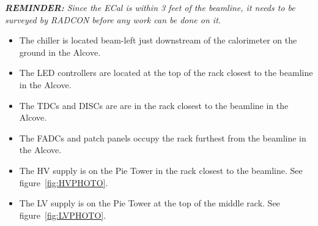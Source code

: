 \documentclass[12pt]{article}
\begin{document}
   {\em{\bf REMINDER:} Since the ECal is within 3 feet of the beamline, it needs to be surveyed by RADCON before any work can be done on it.}
   {\footnotesize
\begin{itemize}
\item
The chiller is located beam-left just downstream of the calorimeter on the ground in the Alcove.
\item
The LED controllers are located at the top of the rack closest to the beamline in the Alcove.
\item
The TDCs and DISCs are are in the rack closest to the beamline in the Alcove.
\item
The FADCs and patch panels occupy the rack furthest from the beamline in the Alcove.
\item
    The HV supply is on the Pie Tower in the rack closest to the beamline.  See figure~\ref{fig:HVPHOTO}.
\item
    The LV supply is on the Pie Tower at the top of the middle rack. See figure~\ref{fig:LVPHOTO}.
\end{itemize}

}
\end{document}
